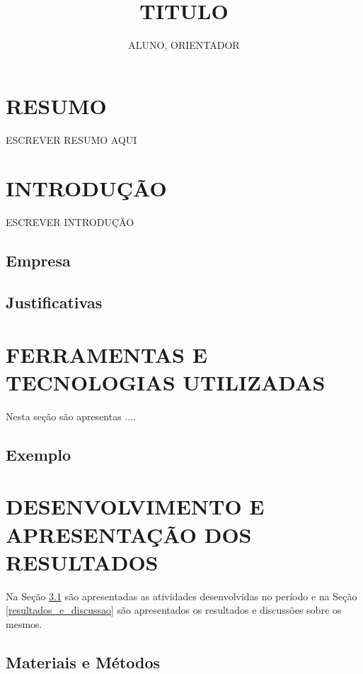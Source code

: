 \documentclass[12pt]{article}
\title{TITULO} %
\author{ALUNO\inst{1}, ORIENTADOR\inst{1} } %
\begin{document}
\thispagestyle{empty} %
\begin{spacing}{0.1} %
\tableofcontents %
\begin{spacing}{0.1}
 
\clearpage %
\setcounter{page}{4} %

\section*{RESUMO}
\thispagestyle{empty}
ESCREVER RESUMO AQUI

\clearpage

\section{INTRODUÇÃO}
ESCREVER INTRODUÇÃO

\subsection{Empresa}
\lipsum[2-4]

\subsection{Justificativas}

\section{FERRAMENTAS E TECNOLOGIAS UTILIZADAS}

    Nesta seção são apresentas ....

    \subsection{Exemplo}

\section{DESENVOLVIMENTO E APRESENTAÇÃO DOS RESULTADOS}
    Na Seção \ref{materiais_e_metodos} são apresentadas as atividades desenvolvidas no período e na Seção \ref{resultados_e_discussao} são apresentados os resultados e discussões sobre os mesmos.

\subsection{Materiais e Métodos}
\label{materiais_e_metodos}
    

\end{spacing}
\end{spacing}
\end{document}
